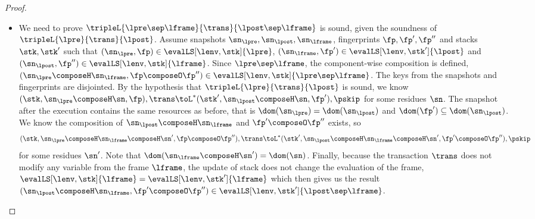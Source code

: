 \begin{proof}
\begin{itemize}
\item {}
We need to prove \( \tripleL{\lpre \sep \lframe }{\trans}{\lpost \sep \lframe} \) is sound, 
given the soundness of  \( \tripleL{\lpre}{\trans}{\lpost} \).
Assume snapshots \( \sn_\lpre, \sn_\lpost, \sn_\lframe \), fingerprints \( \fp, \fp', \fp'' \) and stacks\( \stk, \stk' \) 
such that \( ( \sn_\lpre, \fp ) \in \evalLS[\lenv, \stk]{\lpre} \), \( ( \sn_\lframe, \fp' ) \in \evalLS[\lenv, \stk']{\lpost} \) and \( ( \sn_\lpost, \fp'' ) \in \evalLS[\lenv, \stk]{\lframe}\).
Since \( \lpre \sep \lframe \), the component-wise composition is defined, \ie \( (\sn_\lpre \composeH \sn_\lframe, \fp \composeO \fp'') \in \evalLS[\lenv, \stk]{\lpre \sep \lframe} \).
The keys from the snapshots and fingerprints are disjointed.
By the hypothesis that \( \tripleL{\lpre}{\trans}{\lpost} \) is sound, 
we know \( ( \stk, \sn_\lpre \composeH \sn, \fp ), \trans \toL^{*} ( \stk', \sn_\lpost \composeH \sn, \fp' ), \pskip \) for some residues \( \sn \).
The snapshot after the execution contains the same resources as before, that is \( \dom(\sn_\lpre) = \dom(\sn_\lpost) \) and \( \dom(\fp') \subseteq \dom(\sn_\lpost) \).
We know the composition of \( \sn_\lpost \composeH \sn_\lframe \) and \( \fp' \composeO \fp''\) exists, 
so 
\[ 
    ( \stk, \sn_\lpre \composeH \sn_\lframe \composeH \sn', \fp \composeO \fp''), \trans \toL^{*} ( \stk', \sn_\lpost \composeH \sn_\lframe \composeH \sn', \fp' \composeO \fp'' ), \pskip 
\]
for some residues \( \sn' \).
Note that \( \dom(\sn_\lframe \composeH \sn') = \dom(\sn) \).
Finally, because the transaction \( \trans \) does not modify any variable from the frame \( \lframe \), 
the update of stack does not change the evaluation of the frame, 
\( \evalLS[\lenv, \stk]{\lframe} = \evalLS[\lenv, \stk']{\lframe} \) which then gives us the result \( (\sn_\lpost \composeH \sn_\lframe, \fp' \composeO \fp'') \in \evalLS[\lenv, \stk']{\lpost \sep \lframe} \).
\end{itemize}
\end{proof}

